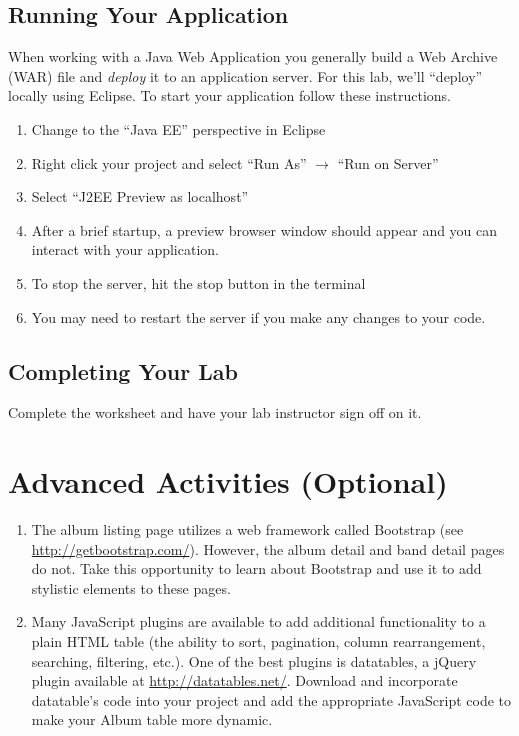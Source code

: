 \documentclass[12pt]{scrartcl}
\begin{document}
\subsection*{Running Your Application}

When working with a Java Web Application you generally build
a Web Archive (WAR) file and \emph{deploy} it to an application server.  
For this lab, we'll ``deploy'' locally using Eclipse.  To start
your application follow these instructions.

\begin{enumerate}
  \item Change to the ``Java EE'' perspective in Eclipse
  \item Right click your project and select ``Run As'' 
  $\rightarrow$ ``Run on Server''
  \item Select ``J2EE Preview as localhost''
  \item After a brief startup, a preview browser window 
  should appear and you can interact with your application.
  \item To stop the server, hit the stop button in the terminal
  \item You may need to restart the server if you make any
  changes to your code.
\end{enumerate}

\subsection*{Completing Your Lab}

Complete the worksheet and have your lab instructor sign off on it.

\section*{Advanced Activities (Optional)}

\begin{enumerate}
  \item The album listing page utilizes a web framework called Bootstrap
  	(see \url{http://getbootstrap.com/}).  However, the album detail and 
	band detail pages do not.  Take this opportunity to learn about 
	Bootstrap and use it to add stylistic elements to these pages.
  \item Many JavaScript plugins are available to add additional 
    functionality to a plain HTML table (the ability to sort, pagination,
    column rearrangement, searching, filtering, etc.).  One of the best 
    plugins is datatables, a jQuery plugin available at 
    \url{http://datatables.net/}.  Download and incorporate datatable's 
    code into your project and add the appropriate JavaScript code 
    to make your Album table more dynamic.
\end{enumerate}
\end{document}
